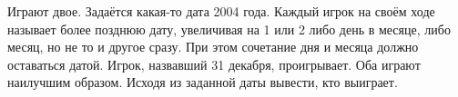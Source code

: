 Играют двое. Задаётся какая-то дата 2004 года. Каждый игрок на своём ходе называет более позднюю дату, увеличивая на 1 или 2 либо день в месяце, либо месяц, но не то и другое сразу. При этом сочетание дня и месяца должно оставаться датой. Игрок, назвавший 31 декабря, проигрывает. Оба играют наилучшим образом. Исходя из заданной даты вывести, кто выиграет.